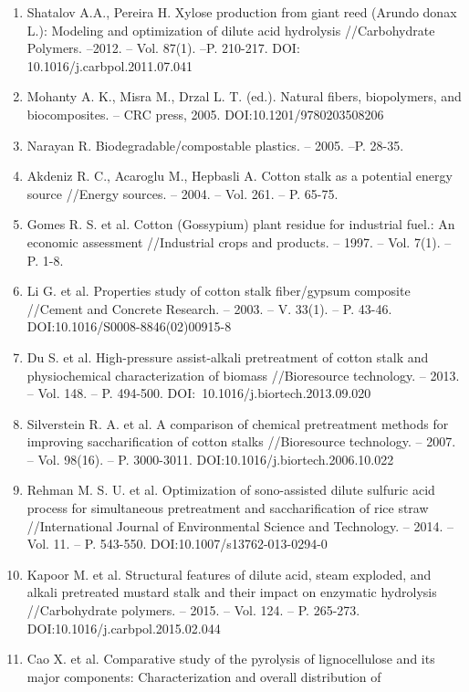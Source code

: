 \begin{enumerate}
\def\labelenumi{\arabic{enumi}.}
\item
  Shatalov A.A., Pereira H. Xylose production from giant reed (Arundo
  donax L.): Modeling and optimization of dilute acid hydrolysis
  //Carbohydrate Polymers. --2012. -- Vol. 87(1). --P. 210-217. DOI:
  10.1016/j.carbpol.2011.07.041
\item
  Mohanty A. K., Misra M., Drzal L. T. (ed.). Natural fibers,
  biopolymers, and biocomposites. -- CRC press, 2005.
  DOI:10.1201/9780203508206
\item
  Narayan R. Biodegradable/compostable plastics. -- 2005. --P. 28-35.
\item
  Akdeniz R. C., Acaroglu M., Hepbasli A. Cotton stalk as a potential
  energy source //Energy sources. -- 2004. -- Vol. 261. -- P. 65-75.
\item
  Gomes R. S. et al. Cotton (Gossypium) plant residue for industrial
  fuel.: An economic assessment //Industrial crops and products. --
  1997. -- Vol. 7(1). -- P. 1-8.
\item
  Li G. et al. Properties study of cotton stalk fiber/gypsum composite
  //Cement and Concrete Research. -- 2003. -- V. 33(1). -- P. 43-46.
  DOI:10.1016/S0008-8846(02)00915-8
\item
  Du S. et al. High-pressure assist-alkali pretreatment of cotton stalk
  and physiochemical characterization of biomass //Bioresource
  technology. -- 2013. -- Vol. 148. -- P. 494-500.
  DOI:~10.1016/j.biortech.2013.09.020
\item
  Silverstein R. A. et al. A comparison of chemical pretreatment methods
  for improving saccharification of cotton stalks //Bioresource
  technology. -- 2007. -- Vol. 98(16). -- P. 3000-3011.
  DOI:10.1016/j.biortech.2006.10.022
\item
  Rehman M. S. U. et al. Optimization of sono-assisted dilute sulfuric
  acid process for simultaneous pretreatment and saccharification of
  rice straw //International Journal of Environmental Science and
  Technology. -- 2014. -- Vol. 11. -- P. 543-550.
  DOI:10.1007/s13762-013-0294-0
\item
  Kapoor M. et al. Structural features of dilute acid, steam exploded,
  and alkali pretreated mustard stalk and their impact on enzymatic
  hydrolysis //Carbohydrate polymers. -- 2015. -- Vol. 124. -- P.
  265-273. DOI:10.1016/j.carbpol.2015.02.044
\item
  Cao X. et al. Comparative study of the pyrolysis of lignocellulose and
  its major components: Characterization and overall distribution of

\end{enumerate}
